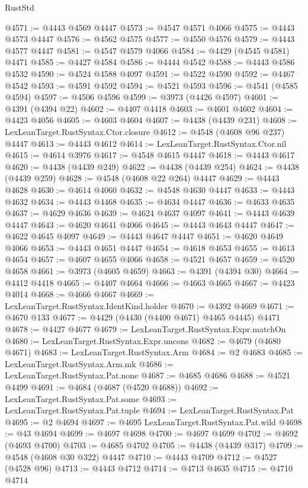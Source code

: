 \begin{lexlean}{RustStd}
\begin{coremodule}
@4571 := @4443 @4569 @4447
@4573 := @4547 @4571 @4066
@4575 := @4443 @4573 @4447
@4576 := @4562 @4575
@4577 := @4550 @4576
@4579 := @4443 @4577 @4447
@4581 := @4547 @4579 @4066
@4584 := @4429 (@4545 @4581) @4471
@4585 := @4427 @4584
@4586 := @4444 @4542
@4588 := @4443 @4586 @4532
@4590 := @4524 @4588 @4097
@4591 := @4522 @4590
@4592 := @4467 @4542
@4593 := @4591 @4592
@4594 := @4521 @4593
@4596 := @4541 (@4585 @4594)
@4597 := @4506 @4596
@4599 := @3973 (@4426 @4597)
@4601 := @4391 (@4394 @22)
@4602 := @4407 @4418
@4603 := @4601 @4602
@4604 := @4423 @4056
@4605 := @4603 @4604
@4607 := @4438 (@4439 @231)
@4608 := LexLeanTarget.RustSyntax.Ctor.closure
@4612 := @4548 (@4608 @96 @237) @4447
@4613 := @4443 @4612
@4614 := LexLeanTarget.RustSyntax.Ctor.nil
@4615 := @4614 @3976
@4617 := @4548 @4615 @4447
@4618 := @4443 @4617
@4620 := @4438 (@4439 @249)
@4622 := @4438 (@4439 @254)
@4624 := @4438 (@4439 @259)
@4628 := @4548 (@4608 @22 @264) @4447
@4629 := @4443 @4628
@4630 := @4614 @4060
@4632 := @4548 @4630 @4447
@4633 := @4443 @4632
@4634 := @4443 @4468
@4635 := @4634 @4447
@4636 := @4633 @4635
@4637 := @4629 @4636
@4639 := @4624 @4637 @4097
@4641 := @4443 @4639 @4447
@4643 := @4620 @4641 @4066
@4645 := @4443 @4643 @4447
@4647 := @4622 @4645 @4097
@4649 := @4443 @4647 @4447
@4651 := @4620 @4649 @4066
@4653 := @4443 @4651 @4447
@4654 := @4618 @4653
@4655 := @4613 @4654
@4657 := @4607 @4655 @4066
@4658 := @4521 @4657
@4659 := @4520 @4658
@4661 := @3973 (@4605 @4659)
@4663 := @4391 (@4394 @30)
@4664 := @4412 @4418
@4665 := @4407 @4664
@4666 := @4663 @4665
@4667 := @4423 @4014
@4668 := @4666 @4667
@4669 := LexLeanTarget.RustSyntax.IdentKind.holder
@4670 := @4392 @4669
@4671 := @4670 @133
@4677 := @4429 (@4430 (@4400 @4671) @4465 @4445) @4471
@4678 := @4427 @4677
@4679 := LexLeanTarget.RustSyntax.Expr.matchOn
@4680 := LexLeanTarget.RustSyntax.Expr.uncons
@4682 := @4679 (@4680 @4671)
@4683 := LexLeanTarget.RustSyntax.Arm
@4684 := @2 @4683
@4685 := LexLeanTarget.RustSyntax.Arm.mk
@4686 := LexLeanTarget.RustSyntax.Pat.none
@4687 := @4685 @4686
@4688 := @4521 @4499
@4691 := @4684 (@4687 (@4520 @4688))
@4692 := LexLeanTarget.RustSyntax.Pat.some
@4693 := LexLeanTarget.RustSyntax.Pat.tuple
@4694 := LexLeanTarget.RustSyntax.Pat
@4695 := @2 @4694
@4697 := @4695 LexLeanTarget.RustSyntax.Pat.wild
@4698 := @43 @4694
@4699 := @4697 @4698
@4700 := @4697 @4699
@4702 := @4692 (@4693 @4700)
@4703 := @4685 @4702
@4705 := @4438 (@4439 @317)
@4709 := @4548 (@4608 @30 @322) @4447
@4710 := @4443 @4709
@4712 := @4527 (@4528 @96)
@4713 := @4443 @4712
@4714 := @4713 @4635
@4715 := @4710 @4714

\end{coremodule}
\end{lexlean}
